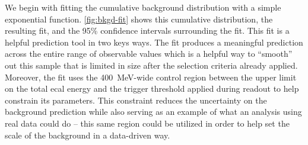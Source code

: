 We begin with fitting the cumulative background distribution with a simple exponential function.
\cref{fig:bkgd-fit} shows this cumulative distribution, the resulting fit, and the 95\% confidence
intervals surrounding the fit.
This fit is a helpful prediction tool in two keys ways.
The fit produces a meaningful prediction across the entire range of observable values
which is a helpful way to ``smooth'' out this sample that is limited in size after the selection
criteria already applied.
Moreover, the fit uses the \qty{400}{\MeV}-wide control region between the upper limit on the total
\ac{ecal} energy and the trigger threshold applied during readout to help constrain its parameters.
This constraint reduces the uncertainty on the background prediction while also serving
as an example of what an analysis using real data could do -- this same region could be utilized
in order to help set the scale of the background in a data-driven way.

